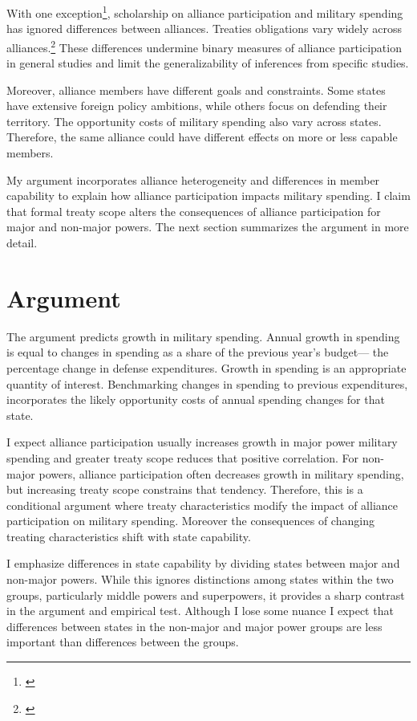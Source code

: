 \documentclass[12pt]{article}
\begin{document}
With one exception\footnote{\citep{DigiuseppePoast2016}}, scholarship on alliance participation and military spending has ignored differences between alliances.
Treaties obligations vary widely across alliances.\footnote{\citep{Leedsetal2002}}
These differences undermine binary measures of alliance participation in general studies and limit the generalizability of inferences from specific studies. 
 

Moreover, alliance members have different goals and constraints.
Some states have extensive foreign policy ambitions, while others focus on defending their territory. 
The opportunity costs of military spending also vary across states. 
Therefore, the same alliance could have different effects on more or less capable members. 


My argument incorporates alliance heterogeneity and differences in member capability to explain how alliance participation impacts military spending. 
I claim that formal treaty scope alters the consequences of alliance participation for major and non-major powers. 
The next section summarizes the argument in more detail. 



\section{Argument}

The argument predicts growth in military spending. 
Annual growth in spending is equal to changes in spending as a share of the previous year's budget--- the percentage change in defense expenditures. 
Growth in spending is an appropriate quantity of interest. 
Benchmarking changes in spending to previous expenditures, incorporates the likely opportunity costs of annual spending changes for that state. 


I expect alliance participation usually increases growth in major power military spending and greater treaty scope reduces that positive correlation. 
For non-major powers, alliance participation often decreases growth in military spending, but increasing treaty scope constrains that tendency. 
Therefore, this is a conditional argument where treaty characteristics modify the impact of alliance participation on military spending.
Moreover the consequences of changing treating characteristics shift with state capability.  

I emphasize differences in state capability by dividing states between major and non-major powers. 
While this ignores distinctions among states within the two groups, particularly middle powers and superpowers, it provides a sharp contrast in the argument and empirical test.
Although I lose some nuance I expect that differences between states in the non-major and major power groups are less important than differences between the groups. 
\end{document}
